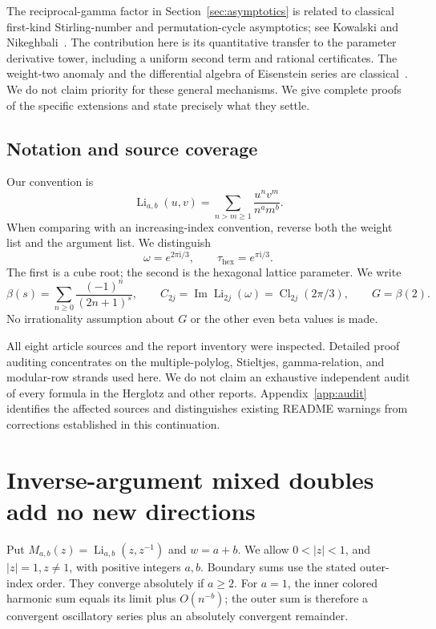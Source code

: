 \documentclass[11pt]{article}
\theoremstyle{definition}
\theoremstyle{remark}
\newcommand{\Li}{\operatorname{Li}}
\newcommand{\Cl}{\operatorname{Cl}}
\newcommand{\ii}{\mathrm{i}}
\newcommand{\Impart}{\operatorname{Im}}
\begin{document}
The reciprocal-gamma factor in Section~\ref{sec:asymptotics} is related to
classical first-kind Stirling-number and permutation-cycle asymptotics;
see Kowalski and Nikeghbali~\cite{KowalskiNikeghbali}.
The contribution here is its quantitative transfer to the parameter
derivative tower, including a uniform second term and rational
certificates. The weight-two anomaly and the differential algebra of
Eisenstein series are classical~\cite{RomikScherer,Ramanujan}.
We do not claim priority for these general mechanisms. We give complete
proofs of the specific extensions and state precisely what they settle.

\subsection{Notation and source coverage}

Our convention is
\[
\Li_{a,b}(u,v)=\sum_{n>m\ge1}\frac{u^n v^m}{n^a m^b}.
\]
When comparing with an increasing-index convention, reverse both
the weight list and the argument list. We distinguish
\[
\omega=e^{2\pi\ii/3},\qquad \tau_{\mathrm{hex}}=e^{\pi\ii/3}.
\]
The first is a cube root; the second is the hexagonal lattice parameter.
We write
\[
\beta(s)=\sum_{n\ge0}\frac{(-1)^n}{(2n+1)^s},\qquad
C_{2j}=\Impart\Li_{2j}(\omega)=\Cl_{2j}(2\pi/3),\qquad G=\beta(2).
\]
No irrationality assumption about \(G\) or the other even beta values
is made.

All eight article sources and the report inventory were inspected.
Detailed proof auditing concentrates on the multiple-polylog, Stieltjes,
gamma-relation, and modular-row strands used here.
We do not claim an exhaustive independent audit of every formula in the
Herglotz and other reports. Appendix~\ref{app:audit} identifies the
affected sources and distinguishes existing README warnings from
corrections established in this continuation.

\section{Inverse-argument mixed doubles add no new directions}
\label{sec:mixed}

Put \(M_{a,b}(z)=\Li_{a,b}(z,z^{-1})\) and \(w=a+b\).
We allow \(0<|z|<1\), and \(|z|=1,z\ne1\), with positive integers
\(a,b\). Boundary sums use the stated outer-index order. They converge
absolutely if \(a\ge2\). For \(a=1\), the inner colored harmonic sum
equals its limit plus \(O(n^{-b})\); the outer sum is therefore a
convergent oscillatory series plus an absolutely convergent remainder.
\end{document}
